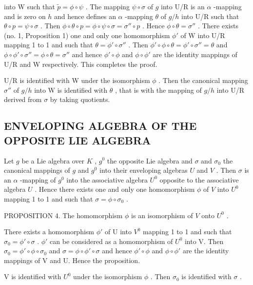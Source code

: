 into W such that \(\tilde{p} = \phi \circ \psi\) . The mapping \(\psi \circ \sigma\) of \(g\) into U/R is an \(\alpha\) -mapping and is zero on \(h\) and hence defines an \(\alpha\) -mapping \(\theta\) of \(g / h\) into U/R such that \(\theta \circ p = \psi \circ \sigma\) . Then \(\phi \circ \theta \circ p = \phi \circ \psi \circ \sigma = \sigma'' \circ p\) . Hence \(\phi \circ \theta = \sigma''\) . There exists (no. 1, Proposition 1) one and only one homomorphism \(\phi'\) of W into U/R mapping 1 to 1 and such that \(\theta = \phi' \circ \sigma''\) . Then \(\phi' \circ \phi \circ \theta = \phi' \circ \sigma'' = \theta\) and \(\phi \circ \phi' \circ \sigma'' = \phi \circ \theta = \sigma''\) and hence \(\phi' \circ \phi\) and \(\phi \circ \phi'\) are the identity mappings of U/R and W respectively. This completes the proof.

U/R is identified with W under the isomorphism \(\phi\) . Then the canonical mapping \(\sigma''\) of \(g/h\) into W is identified with \(\theta\) , that is with the mapping of \(g/h\) into U/R derived from \(\sigma\) by taking quotients.

\subsection{ENVELOPING ALGEBRA OF THE OPPOSITE LIE ALGEBRA}

Let \(g\) be a Lie algebra over \(K\) , \(g^0\) the opposite Lie algebra and \(\sigma\) and \(\sigma_0\) the canonical mappings of \(g\) and \(g^0\) into their enveloping algebras \(U\) and \(V\) . Then \(\sigma\) is an \(\alpha\) -mapping of \(g^0\) into the associative algebra \(U^0\) opposite to the associative algebra \(U\) . Hence there exists one and only one homomorphism \(\phi\) of \(V\) into \(U^0\) mapping 1 to 1 and such that \(\sigma = \phi \circ \sigma_0\) .

PROPOSITION 4. The homomorphism \(\phi\) is an isomorphism of \(V\) onto \(U^0\) .

There exists a homomorphism \(\phi'\) of U into \(V^0\) mapping 1 to 1 and such that \(\sigma_0 = \phi' \circ \sigma\) . \(\phi'\) can be considered as a homomorphism of \(U^0\) into V. Then \(\sigma_0 = \phi' \circ \phi \circ \sigma_0\) and \(\sigma = \phi \circ \phi' \circ \sigma\) and hence \(\phi' \circ \phi\) and \(\phi \circ \phi'\) are the identity mappings of V and U. Hence the proposition.

V is identified with \(U^{0}\) under the isomorphism \(\phi\) . Then \(\sigma_{0}\) is identified with \(\sigma\) .

